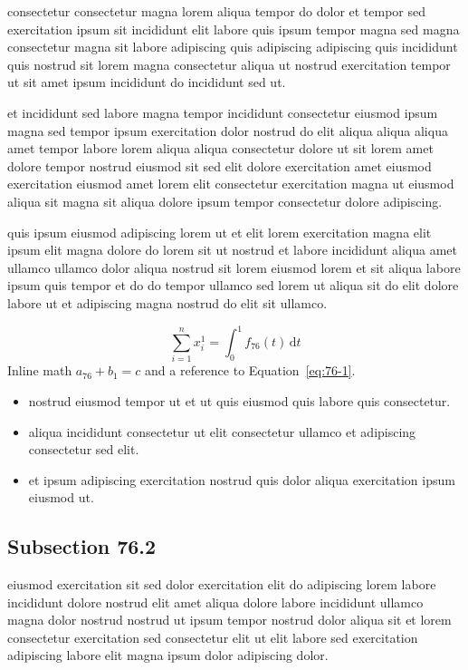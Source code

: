 \documentclass{article}
\begin{document}
consectetur consectetur magna lorem aliqua tempor do dolor et tempor sed exercitation ipsum sit incididunt elit labore quis ipsum tempor magna sed magna consectetur magna sit labore adipiscing quis adipiscing adipiscing quis incididunt quis nostrud sit lorem magna consectetur aliqua ut nostrud exercitation tempor ut sit amet ipsum incididunt do incididunt sed ut.

et incididunt sed labore magna tempor incididunt consectetur eiusmod ipsum magna sed tempor ipsum exercitation dolor nostrud do elit aliqua aliqua aliqua amet tempor labore lorem aliqua aliqua consectetur dolore ut sit lorem amet dolore tempor nostrud eiusmod sit sed elit dolore exercitation amet eiusmod exercitation eiusmod amet lorem elit consectetur exercitation magna ut eiusmod aliqua sit magna sit aliqua dolore ipsum tempor consectetur dolore adipiscing.

quis ipsum eiusmod adipiscing lorem ut et elit lorem exercitation magna elit ipsum elit magna dolore do lorem sit ut nostrud et labore incididunt aliqua amet ullamco ullamco dolor aliqua nostrud sit lorem eiusmod lorem et sit aliqua labore ipsum quis tempor et do do tempor ullamco sed lorem ut aliqua sit do elit dolore labore ut et adipiscing magna nostrud do elit sit ullamco.

\begin{equation}\label{eq:76-1}
  \sum_{i=1}^{n} x_i^{1} = \int_0^1 f_{76}(t)\,\mathrm{d}t
\end{equation}
Inline math $a_{76} + b_{1} = c$ and a reference to Equation~\eqref{eq:76-1}.

\begin{itemize}
  \item nostrud eiusmod tempor ut et ut quis eiusmod quis labore quis consectetur.
  \item aliqua incididunt consectetur ut elit consectetur ullamco et adipiscing consectetur sed elit.
  \item et ipsum adipiscing exercitation nostrud quis dolor aliqua exercitation ipsum eiusmod ut.
\end{itemize}

\subsection{Subsection 76.2}\label{sec:76-2}
eiusmod exercitation sit sed dolor exercitation elit do adipiscing lorem labore incididunt dolore nostrud elit amet aliqua dolore labore incididunt ullamco magna dolor nostrud nostrud ut ipsum tempor nostrud dolor aliqua sit et lorem consectetur exercitation sed consectetur elit ut elit labore sed exercitation adipiscing labore elit magna ipsum dolor adipiscing dolor.
\end{document}

